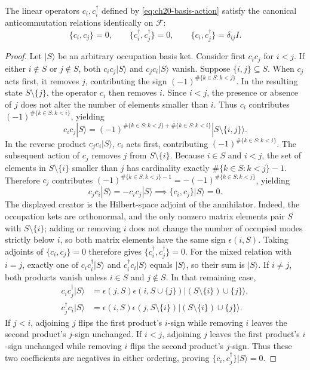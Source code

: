 \begin{theorem}
\label{thm:ch20-constructive-car}
The linear operators $c_i, c_i^\dagger$ defined by \eqref{eq:ch20-basis-action} satisfy the
canonical anticommutation relations identically on $\mathcal F$:
\begin{equation}
 \{c_i, c_j\} = 0, \qquad
 \{c_i^\dagger, c_j^\dagger\} = 0, \qquad
 \{c_i, c_j^\dagger\} = \delta_{ij} I.
 \label{eq:ch20-exact-car-basis}
\end{equation}
\end{theorem}
\begin{proof}
Let $|S\rangle$ be an arbitrary occupation basis ket.
Consider first $c_i c_j$ for $i < j$.
If either $i \notin S$ or $j \notin S$, both $c_i c_j |S\rangle$ and $c_j c_i |S\rangle$ vanish.
Suppose $\{i, j\} \subseteq S$.
When $c_j$ acts first, it removes $j$, contributing the sign $(-1)^{\#\{k \in S : k < j\}}$.
In the resulting state $S \setminus \{j\}$, the operator $c_i$ then removes $i$.
Since $i < j$, the presence or absence of $j$ does not alter the number of elements smaller than $i$.
Thus $c_i$ contributes $(-1)^{\#\{k \in S : k < i\}}$, yielding
\[
 c_i c_j |S\rangle = (-1)^{\#\{k \in S : k < j\} + \#\{k \in S : k < i\}} |S \setminus \{i, j\}\rangle.
\]
In the reverse product $c_j c_i |S\rangle$, $c_i$ acts first, contributing $(-1)^{\#\{k \in S : k < i\}}$.
The subsequent action of $c_j$ removes $j$ from $S \setminus \{i\}$.
Because $i \in S$ and $i < j$, the set of elements in $S \setminus \{i\}$ smaller than $j$ has cardinality
exactly $\#\{k \in S : k < j\} - 1$.
Therefore $c_j$ contributes $(-1)^{\#\{k \in S : k < j\} - 1} = -(-1)^{\#\{k \in S : k < j\}}$, yielding
\[
 c_j c_i |S\rangle = - c_i c_j |S\rangle \implies \{c_i, c_j\}|S\rangle = 0.
\]
The displayed creator is the Hilbert-space adjoint of the annihilator.  Indeed,
the occupation kets are orthonormal, and the only nonzero matrix elements
pair $S$ with $S\setminus\{i\}$; adding or removing $i$ does not change
the number of occupied modes strictly below $i$, so both matrix elements
have the same sign $\epsilon(i,S)$.  Taking adjoints of
$\{c_i,c_j\}=0$ therefore gives $\{c_i^\dagger,c_j^\dagger\}=0$.
For the mixed relation with $i=j$, exactly one of $c_i c_i^\dagger|S\rangle$
and $c_i^\dagger c_i|S\rangle$ equals $|S\rangle$, so their sum is
$|S\rangle$.  If $i\ne j$, both products vanish unless $i\in S$ and
$j\notin S$.  In that remaining case,
\begin{align*}
 c_i c_j^\dagger|S\rangle
 &=\epsilon(j,S)\epsilon(i,S\cup\{j\})
       |(S\setminus\{i\})\cup\{j\}\rangle,\\
 c_j^\dagger c_i|S\rangle
 &=\epsilon(i,S)\epsilon(j,S\setminus\{i\})
       |(S\setminus\{i\})\cup\{j\}\rangle.
\end{align*}
If $j<i$, adjoining $j$ flips the first product's $i$-sign while removing
$i$ leaves the second product's $j$-sign unchanged.  If $i<j$, adjoining
$j$ leaves the first product's $i$-sign unchanged while removing $i$ flips
the second product's $j$-sign.  Thus these two coefficients are negatives
in either ordering, proving $\{c_i,c_j^\dagger\}|S\rangle=0$.
\end{proof}

